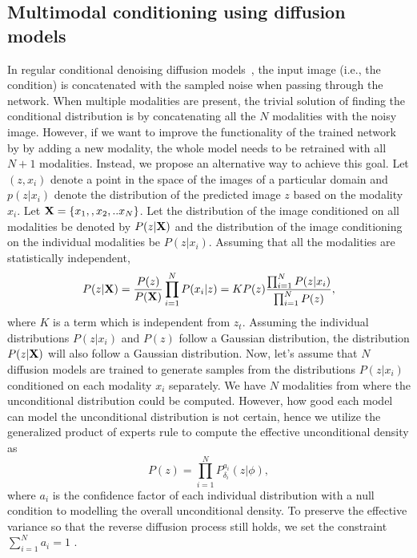 \documentclass[10pt,twocolumn,letterpaper]{article}
\begin{document}
\subsection{Multimodal conditioning using diffusion models}
In regular conditional denoising diffusion models~\cite{saharia2021image}, the input image (i.e., the condition) is concatenated  with the sampled noise when passing through the network. When multiple modalities are present, the trivial solution of finding the conditional distribution is by concatenating all the $N$ modalities with the noisy image. However, if we want to improve the functionality of the trained network by by adding a new modality, the whole model needs to be retrained with all $N+1$ modalities. Instead, we propose an alternative way to achieve this goal. Let $(z, x_i)$ denote a point in the space of the images of a particular domain and $p(z|x_i)$ denote the distribution of the predicted image $z$ based on the modality $x_i$.  Let ${\bf{X}}=\{x_1,,x_2,..x_N\}$. Let the distribution of the image conditioned on all modalities be denoted by $P(z|{\bf{X}})$
and the distribution of the image conditioning on the individual modalities be $P(z|x_i)$.  Assuming that all the modalities are statistically independent,
\begin{multline}
    P(z|{\bf{X}})=\frac{P(z)}{P({\bf{X}})}\prod_{i=1}^{N}P(x_i|z) 
    = KP(z) \frac{\prod_{i=1}^{N}P(z|x_i)}{\prod_{i=1}^{N}P(z)},
    \label{eq:POE1}
\end{multline}
where $K$ is a term which is independent from $z_t$. Assuming the individual distributions $P(z|x_i)$ and $P(z)$ follow a Gaussian distribution, the distribution $P(z|{\bf{X}})$ will also follow a Gaussian distribution.
Now, let's assume that $N$ diffusion models are trained to generate samples from the distributions $P(z|x_i)$ conditioned on each modality $x_i$ separately. 
We have $N$ modalities from where the unconditional distribution could be computed.  However, how good each model can model the unconditional distribution is not certain, hence we utilize the generalized product of experts rule \cite{cao2014generalized} to compute the effective unconditional density as
 \begin{equation}
     P(z) =\prod_{i=1}^{N}P^{a_i}_{\delta_i}(z|\phi),
 \end{equation}
where $a_i$ is the confidence factor of each individual distribution with a null condition to modelling the overall unconditional density. To preserve the effective variance so that the reverse diffusion process still holds,  we set the constraint $  \sum_{i=1}^N a_i =1$ .
\end{document}
